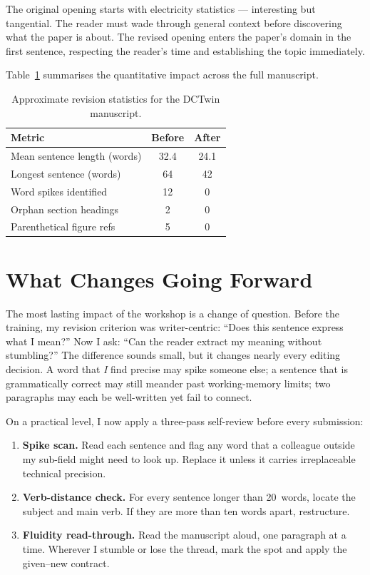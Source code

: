 \documentclass[journal]{IEEEtran}
\begin{document}
\noindent The original opening starts with electricity statistics --- interesting but tangential. The reader must wade through general context before discovering what the paper is about. The revised opening enters the paper's domain in the first sentence, respecting the reader's time and establishing the topic immediately.

\medskip

Table~\ref{tab:stats} summarises the quantitative impact across the full manuscript.

\begin{table}[t]
\centering
\caption{Approximate revision statistics for the DCTwin manuscript.}
\label{tab:stats}
\begin{tabular}{lcc}
\toprule
Metric & Before & After \\
\midrule
Mean sentence length (words) & 32.4 & 24.1 \\
Longest sentence (words) & 64 & 42 \\
Word spikes identified & 12 & 0 \\
Orphan section headings & 2 & 0 \\
Parenthetical figure refs & 5 & 0 \\
\bottomrule
\end{tabular}
\end{table}

\section{What Changes Going Forward}

The most lasting impact of the workshop is a change of question. Before the training, my revision criterion was writer-centric: ``Does this sentence express what I mean?'' Now I ask: ``Can the reader extract my meaning without stumbling?'' The difference sounds small, but it changes nearly every editing decision. A word that \emph{I} find precise may spike someone else; a sentence that is grammatically correct may still meander past working-memory limits; two paragraphs may each be well-written yet fail to connect.

On a practical level, I now apply a three-pass self-review before every submission:

\begin{enumerate}
\item \textbf{Spike scan.} Read each sentence and flag any word that a colleague outside my sub-field might need to look up. Replace it unless it carries irreplaceable technical precision.
\item \textbf{Verb-distance check.} For every sentence longer than 20~words, locate the subject and main verb. If they are more than ten words apart, restructure.
\item \textbf{Fluidity read-through.} Read the manuscript aloud, one paragraph at a time. Wherever I stumble or lose the thread, mark the spot and apply the given--new contract.
\end{enumerate}
\end{document}
